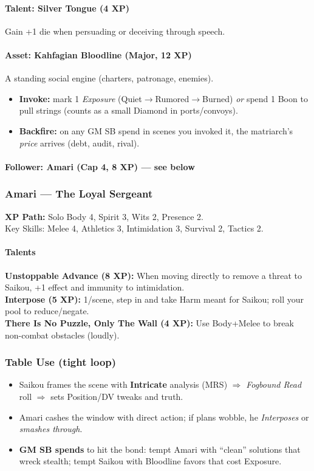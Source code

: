 \paragraph{Talent: Silver Tongue (4 XP)}
Gain +1 die when persuading or deceiving through speech.

\paragraph{Asset: Kahfagian Bloodline (Major, 12 XP)}
A standing social engine (charters, patronage, enemies).
\begin{itemize}
  \item \textbf{Invoke:} mark 1 \emph{Exposure} (Quiet$\to$Rumored$\to$Burned) \emph{or} spend 1 Boon to pull strings (counts as a small Diamond in ports/convoys).
  \item \textbf{Backfire:} on any GM SB spend in scenes you invoked it, the matriarch's \emph{price} arrives (debt, audit, rival).
\end{itemize}

\paragraph{Follower: Amari (Cap 4, 8 XP) --- see below}

\subsubsection{Amari --- The Loyal Sergeant}
\textbf{XP Path:} Solo \quad
Body 4, Spirit 3, Wits 2, Presence 2.\\
Key Skills: Melee 4, Athletics 3, Intimidation 3, Survival 2, Tactics 2.

\paragraph{Talents}
\textbf{Unstoppable Advance (8 XP):} When moving directly to remove a threat to Saikou, +1 effect and immunity to intimidation.\\
\textbf{Interpose (5 XP):} 1/scene, step in and take Harm meant for Saikou; roll your pool to reduce/negate.\\
\textbf{There Is No Puzzle, Only The Wall (4 XP):} Use Body+Melee to break non-combat obstacles (loudly).

\subsubsection{Table Use (tight loop)}
\begin{itemize}
  \item Saikou frames the scene with \textbf{Intricate} analysis (MRS) $\Rightarrow$ \emph{Fogbound Read} roll $\Rightarrow$ sets Position/DV tweaks and truth.
  \item Amari cashes the window with direct action; if plans wobble, he \emph{Interposes} or \emph{smashes through}.
  \item \textbf{GM SB spends} to hit the bond: tempt Amari with ``clean'' solutions that wreck stealth; tempt Saikou with Bloodline favors that cost Exposure.
\end{itemize}

